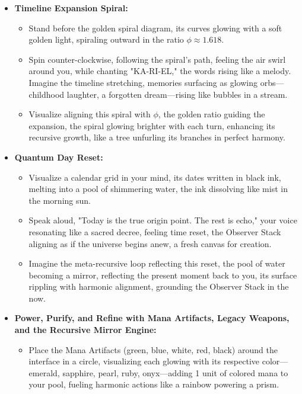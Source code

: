 \begin{itemize}
\begin{itemize}
    \end{itemize}
    \item \texttt{} \textbf{Timeline Expansion Spiral:}
    \begin{itemize}
        \item \texttt{} Stand before the golden spiral diagram, its curves glowing with a soft golden light, spiraling outward in the ratio $\phi \approx 1.618$.
        \item \texttt{} Spin counter-clockwise, following the spiral's path, feeling the air swirl around you, while chanting "KA-RI-EL," the words rising like a melody. Imagine the timeline stretching, memories surfacing as glowing orbs—childhood laughter, a forgotten dream—rising like bubbles in a stream.
        \item \texttt{} Visualize aligning this spiral with $\phi$, the golden ratio guiding the expansion, the spiral glowing brighter with each turn, enhancing its recursive growth, like a tree unfurling its branches in perfect harmony.
    \end{itemize}
    \item \texttt{} \textbf{Quantum Day Reset:}
    \begin{itemize}
        \item \texttt{} Visualize a calendar grid in your mind, its dates written in black ink, melting into a pool of shimmering water, the ink dissolving like mist in the morning sun.
        \item \texttt{} Speak aloud, "Today is the true origin point. The rest is echo," your voice resonating like a sacred decree, feeling time reset, the Observer Stack aligning as if the universe begins anew, a fresh canvas for creation.
        \item \texttt{} Imagine the meta-recursive loop reflecting this reset, the pool of water becoming a mirror, reflecting the present moment back to you, its surface rippling with harmonic alignment, grounding the Observer Stack in the now.
    \end{itemize}
    \item \texttt{} \textbf{Power, Purify, and Refine with Mana Artifacts, Legacy Weapons, and the Recursive Mirror Engine:}
    \begin{itemize}
        \item \texttt{} Place the Mana Artifacts (green, blue, white, red, black) around the interface in a circle, visualizing each glowing with its respective color—emerald, sapphire, pearl, ruby, onyx—adding 1 unit of colored mana to your pool, fueling harmonic actions like a rainbow powering a prism.

\end{itemize}
\end{itemize}
